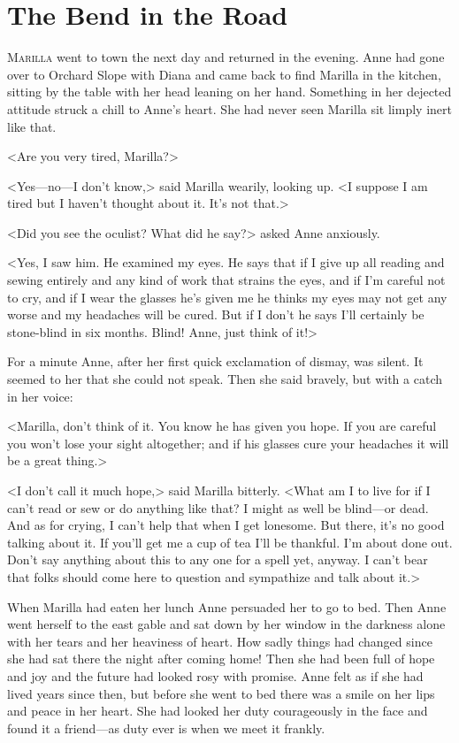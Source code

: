 \chapter{The Bend in the Road}

\lettrine{M}{arilla} went to town the next day and returned in the evening. Anne had gone over to Orchard Slope with Diana and came back to find Marilla in the kitchen, sitting by the table with her head leaning on her hand. Something in her dejected attitude struck a chill to Anne's heart. She had never seen Marilla sit limply inert like that.

<Are you very tired, Marilla?>

<Yes—no—I don't know,> said Marilla wearily, looking up. <I suppose I am tired but I haven't thought about it. It's not that.>

<Did you see the oculist? What did he say?> asked Anne anxiously.

<Yes, I saw him. He examined my eyes. He says that if I give up all reading and sewing entirely and any kind of work that strains the eyes, and if I'm careful not to cry, and if I wear the glasses he's given me he thinks my eyes may not get any worse and my headaches will be cured. But if I don't he says I'll certainly be stone-blind in six months. Blind! Anne, just think of it!>

For a minute Anne, after her first quick exclamation of dismay, was silent. It seemed to her that she could not speak. Then she said bravely, but with a catch in her voice:

<Marilla, don't think of it. You know he has given you hope. If you are careful you won't lose your sight altogether; and if his glasses cure your headaches it will be a great thing.>

<I don't call it much hope,> said Marilla bitterly. <What am I to live for if I can't read or sew or do anything like that? I might as well be blind—or dead. And as for crying, I can't help that when I get lonesome. But there, it's no good talking about it. If you'll get me a cup of tea I'll be thankful. I'm about done out. Don't say anything about this to any one for a spell yet, anyway. I can't bear that folks should come here to question and sympathize and talk about it.>

When Marilla had eaten her lunch Anne persuaded her to go to bed. Then Anne went herself to the east gable and sat down by her window in the darkness alone with her tears and her heaviness of heart. How sadly things had changed since she had sat there the night after coming home! Then she had been full of hope and joy and the future had looked rosy with promise. Anne felt as if she had lived years since then, but before she went to bed there was a smile on her lips and peace in her heart. She had looked her duty courageously in the face and found it a friend—as duty ever is when we meet it frankly.

